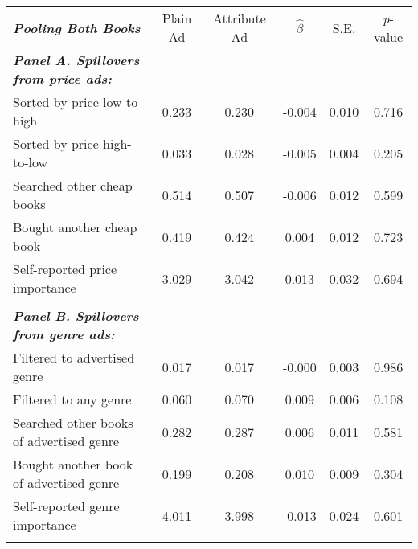 \begin{center}
\begin{tabular}{lccccc}
\hline \noalign{\smallskip}\textbf{\emph{Pooling Both Books}} & Plain Ad & Attribute Ad & $\hat{\beta}$ & S.E. & \emph{p}-value\\
\noalign{\smallskip}\hline \noalign{\smallskip}\textbf{\emph{Panel A. Spillovers from price ads:}} &  &  &  &  & \\
\hspace{5pt} Sorted by price low-to-high & 0.233 & 0.230 & -0.004 & 0.010 & 0.716\\
\hspace{5pt} Sorted by price high-to-low & 0.033 & 0.028 & -0.005 & 0.004 & 0.205\\
\hspace{5pt} Searched other cheap books & 0.514 & 0.507 & -0.006 & 0.012 & 0.599\\
\hspace{5pt} Bought another cheap book & 0.419 & 0.424 & 0.004 & 0.012 & 0.723\\
\hspace{5pt} Self-reported price importance & 3.029 & 3.042 & 0.013 & 0.032 & 0.694\\
  &  &  &  &  & \\
\textbf{\emph{Panel B. Spillovers from genre ads:}} &  &  &  &  & \\
\hspace{5pt} Filtered to advertised genre & 0.017 & 0.017 & -0.000 & 0.003 & 0.986\\
\hspace{5pt} Filtered to any genre & 0.060 & 0.070 & 0.009 & 0.006 & 0.108\\
\hspace{5pt} Searched other books of advertised genre & 0.282 & 0.287 & 0.006 & 0.011 & 0.581\\
\hspace{5pt} Bought another book of advertised genre & 0.199 & 0.208 & 0.010 & 0.009 & 0.304\\
\hspace{5pt} Self-reported genre importance & 4.011 & 3.998 & -0.013 & 0.024 & 0.601\\
\noalign{\smallskip}\hline\end{tabular}\\
\end{center}
